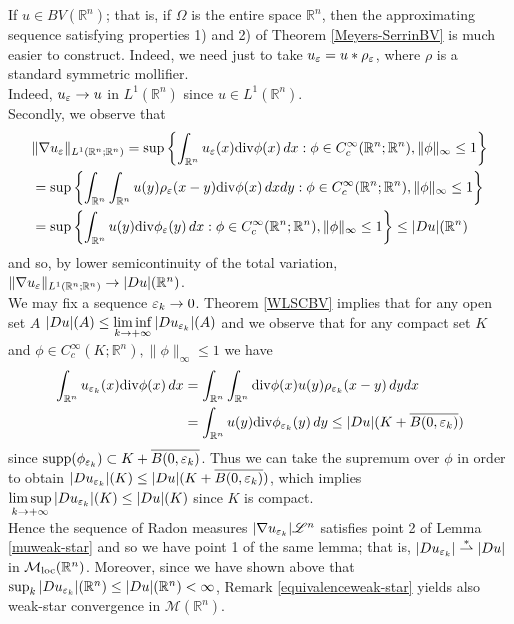 \begin{remark} \label{BVR^N} If $u \in BV(\mathbb{R}^{n})$; that is, if $\Omega$ is the entire space $\mathbb{R}^{n}$, then the approximating sequence satisfying properties 1) and 2) of Theorem \ref{Meyers-SerrinBV} is much easier to construct. Indeed, we need just to take $u_{\varepsilon} = u \ast \rho_{\varepsilon}$, where $\rho$ is a standard symmetric mollifier.
\\
Indeed, $u_{\varepsilon} \to u$ in $L^{1}(\mathbb{R}^{n})$ since $u \in L^{1}(\mathbb{R}^{n})$.
\\
Secondly, we observe that
\begin{align*} & \|\nabla u_{\varepsilon}\|_{L^{1}(\mathbb{R}^{n}; \mathbb{R}^{n})} = \sup \left \{ \int_{\mathbb{R}^{n}} u_{\varepsilon}(x) \mathrm{div}\phi(x) \, dx : \phi \in C^{\infty}_{c}(\mathbb{R}^{n}; \mathbb{R}^{n}), \|\phi\|_{\infty} \le 1 \right \} \\
& = \sup \left \{ \int_{\mathbb{R}^{n}} \int_{\mathbb{R}^{n}} u(y) \rho_{\varepsilon}(x-y) \mathrm{div}\phi(x) \, dx dy : \phi \in C^{\infty}_{c}(\mathbb{R}^{n}; \mathbb{R}^{n}), \|\phi\|_{\infty} \le 1 \right \} \\
& = \sup \left \{ \int_{\mathbb{R}^{n}} u(y) \mathrm{div}\phi_{\varepsilon}(y) \, dx : \phi \in C^{\infty}_{c}(\mathbb{R}^{n}; \mathbb{R}^{n}), \|\phi\|_{\infty} \le 1 \right \} \le |Du|(\mathbb{R}^{n}) \end{align*}
and so, by lower semicontinuity of the total variation, $\|\nabla u_{\varepsilon}\|_{L^{1}(\mathbb{R}^{n}; \mathbb{R}^{n})} \to |Du|(\mathbb{R}^{n})$.
\\
We may fix a sequence $\varepsilon_{k} \to 0$. Theorem \ref{WLSCBV} implies that for any open set $A$ $|D u|(A) \le \liminf\limits_{k \to +\infty} |D u_{\varepsilon_{k}}|(A)$ and we observe that for any compact set $K$ and $\phi \in C^{\infty}_{c}(K; \mathbb{R}^{n}), \|\phi\|_{\infty} \le 1$ we have
\begin{align*} \int_{\mathbb{R}^{n}} u_{\varepsilon_{k}}(x) \mathrm{div}\phi(x) \, dx & = \int_{\mathbb{R}^{n}} \int_{\mathbb{R}^{n}} \mathrm{div}\phi(x) u(y)  \rho_{\varepsilon_{k}}(x - y) \, dy dx \\
& = \int_{\mathbb{R}^{n}} u(y) \mathrm{div}\phi_{\varepsilon_{k}}(y) \, dy \le |D u|(K + \overline{B(0, \varepsilon_{k})})
\end{align*}
since $\mathrm{supp}(\phi_{\varepsilon_{k}}) \subset K + \overline{B(0, \varepsilon_{k})}$. Thus we can take the supremum over $\phi$ in order to obtain $|D u_{\varepsilon_{k}}|(K) \le |D u|(K + \overline{B(0, \varepsilon_{k})})$, which implies $\limsup \limits_{k \to + \infty} |D u_{\varepsilon_{k}}|(K) \le |D u|(K)$ since $K$ is compact.
\\
Hence the sequence of Radon measures $|\nabla u_{\varepsilon_{k}}| \mathscr{L}^{n}$ satisfies point 2 of Lemma \ref{muweak-star} and so we have point 1 of the same lemma; that is, $|D u_{\varepsilon_{k}}| \stackrel {*}{\rightharpoonup} |Du|$ in $\mathcal{M}_{\rm loc}(\mathbb{R}^{n})$. Moreover, since we have shown above that $\sup_{k} |Du_{\varepsilon_{k}}|(\mathbb{R}^{n}) \le |Du|(\mathbb{R}^{n}) < \infty$, Remark \ref{equivalenceweak-star} yields also weak-star convergence in $\mathcal{M}(\mathbb{R}^{n})$.



\end{remark}
